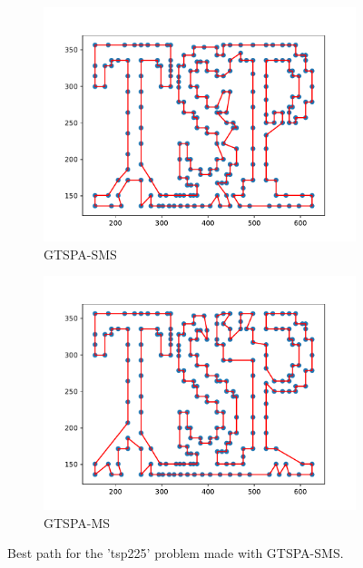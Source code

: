 \documentclass[12pt]{article}
\theoremstyle{plain}
\theoremstyle{definition}
\theoremstyle{remark}
\begin{document}
\begin{figure}[ht]
	\begin{subfigure}{.5\textwidth}
		\centering
		\includegraphics[width=\textwidth]{../../Implementation/gen/best_path_gtspasms_tsp225}
		\caption {GTSPA-SMS}
	\end{subfigure}%
	\begin{subfigure}{.5\textwidth}
		\centering
		\includegraphics[width=\textwidth]{../../Implementation/gen/best_path_gtspams_tsp225}
		\caption {GTSPA-MS}
	\end{subfigure}
    \caption{Best path for the 'tsp225' problem made with GTSPA-SMS.}
    \label{fig:best_path_tsp225_in_text}
\end{figure}
\end{document}
